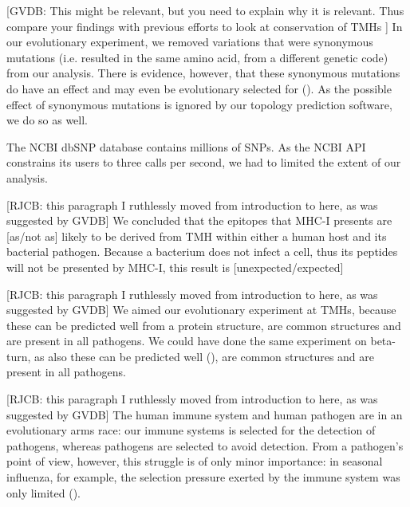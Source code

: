 [GVDB: 
  This might be relevant, but you need to explain why it is relevant. 
  Thus compare your findings with previous efforts 
  to look at conservation of TMHs
]
%
In our evolutionary experiment, 
we removed variations that were synonymous mutations (i.e.
resulted in the same amino acid, from a different genetic code) 
from our analysis.
There is evidence, however, that these synonymous mutations
do have an effect and may even be evolutionary selected 
for (\cite{hunt2009silent}).
As the possible effect of synonymous mutations is ignored by our
topology prediction software, we do so as well.




The NCBI dbSNP database contains millions of SNPs.
As the NCBI API constrains its users to three calls per second,
we had to limited the extent of our analysis.

[RJCB: this paragraph I ruthlessly moved
from introduction to here, as was suggested by GVDB]
We concluded that the
epitopes that MHC-I presents are [as/not as] likely 
to be derived from TMH within either a human host and its bacterial pathogen.
Because a bacterium does not infect a cell, thus its peptides
will not be presented by MHC-I, this result is [unexpected/expected]

[RJCB: this paragraph I ruthlessly moved
from introduction to here, as was suggested by GVDB]
We aimed our evolutionary experiment at TMHs, because these can
be predicted well from a protein structure,
are common structures and are present in all pathogens. 
We could have done the same experiment on beta-turn,
as also these can be predicted well (\cite{petersen2010netturnp}),
are common structures and are present in all pathogens.

[RJCB: this paragraph I ruthlessly moved
from introduction to here, as was suggested by GVDB]
The human immune system and human pathogen are in an evolutionary
arms race: our immune systems is selected for the detection
of pathogens, whereas pathogens are selected to avoid detection.
From a pathogen's point of view, however, this struggle 
is of only minor importance:
in seasonal influenza, for example, the selection pressure
exerted by the immune system was only limited (\cite{han2019individual}).

